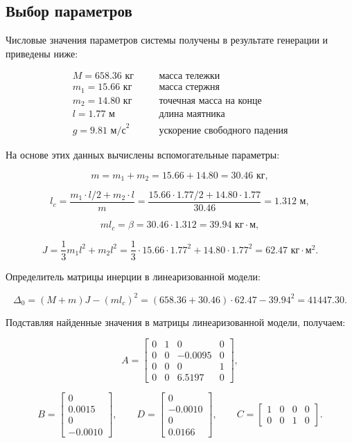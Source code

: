 \documentclass[a4paper,12pt]{article}
\begin{document}
\subsection{Выбор параметров}

Числовые значения параметров системы получены в результате генерации и приведены ниже:

\[
\begin{array}{lll}
	M = 658.36 \text{ кг} & \quad & \text{масса тележки} \\[4pt]
	m_1 = 15.66 \text{ кг} & \quad & \text{масса стержня} \\[4pt]
	m_2 = 14.80 \text{ кг} & \quad & \text{точечная масса на конце} \\[4pt]
	l = 1.77 \text{ м} & \quad & \text{длина маятника} \\[4pt]
	g = 9.81 \text{ м/с}^2 & \quad & \text{ускорение свободного падения}
\end{array}
\]

На основе этих данных вычислены вспомогательные параметры:

\[
m = m_1 + m_2 = 15.66 + 14.80 = 30.46 \text{ кг},
\]

\[
l_c = \frac{m_1 \cdot l/2 + m_2 \cdot l}{m} = \frac{15.66 \cdot 1.77/2 + 14.80 \cdot 1.77}{30.46} = 1.312 \text{ м},
\]

\[
m l_c = \beta = 30.46 \cdot 1.312 = 39.94 \text{ кг}\cdot\text{м},
\]

\[
J = \frac{1}{3}m_1 l^2 + m_2 l^2 = \frac{1}{3} \cdot 15.66 \cdot 1.77^2 + 14.80 \cdot 1.77^2 = 62.47 \text{ кг}\cdot\text{м}^2.
\]

Определитель матрицы инерции в линеаризованной модели:

\[
\Delta_0 = (M+m)J - (m l_c)^2 = (658.36 + 30.46) \cdot 62.47 - 39.94^2 = 41447.30.
\]

Подставляя найденные значения в матрицы линеаризованной модели, получаем:

\[
A = \begin{bmatrix}
	0 & 1 & 0 & 0 \\
	0 & 0 & -0.0095 & 0 \\
	0 & 0 & 0 & 1 \\
	0 & 0 & 6.5197 & 0
\end{bmatrix},
\]

\[
B = \begin{bmatrix}
	0 \\ 0.0015 \\ 0 \\ -0.0010
\end{bmatrix},
\qquad
D = \begin{bmatrix}
	0 \\ -0.0010 \\ 0 \\ 0.0166
\end{bmatrix},
\qquad
C = \begin{bmatrix}
	1 & 0 & 0 & 0 \\
	0 & 0 & 1 & 0
\end{bmatrix}.
\]
		
\end{document}
